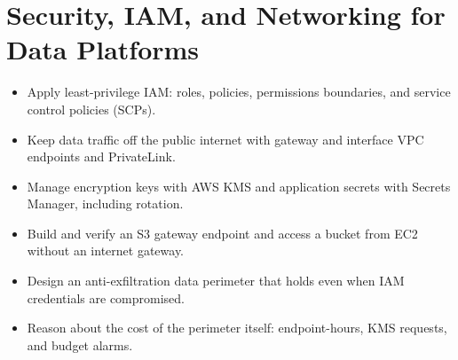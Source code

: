 \chapter{Security, IAM, and Networking for Data Platforms}
%
\begin{objectives}
\begin{itemize}
    \item Apply least-privilege IAM: roles, policies, permissions boundaries, and service control policies (SCPs).
    \item Keep data traffic off the public internet with gateway and interface VPC endpoints and PrivateLink.
    \item Manage encryption keys with AWS KMS and application secrets with Secrets Manager, including rotation.
    \item Build and verify an S3 gateway endpoint and access a bucket from EC2 without an internet gateway.
    \item Design an anti-exfiltration data perimeter that holds even when IAM credentials are compromised.
    \item Reason about the cost of the perimeter itself: endpoint-hours, KMS requests, and budget alarms.
\end{itemize}
\end{objectives}


